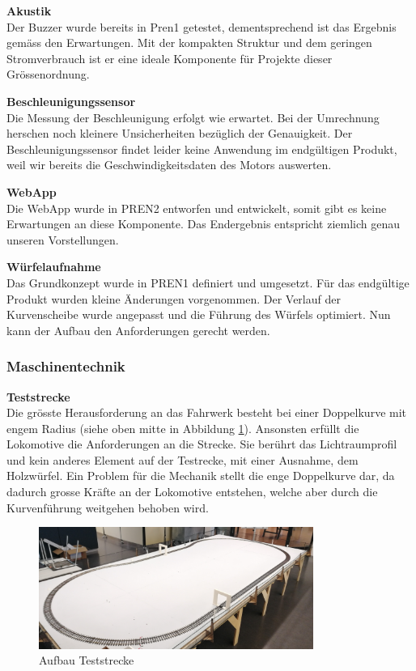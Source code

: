 \documentclass[../../main.tex]{subfiles}
\begin{document}
\textbf{Akustik}\\
Der Buzzer wurde bereits in Pren1 getestet, dementsprechend ist das Ergebnis gemäss den Erwartungen. Mit der kompakten Struktur und dem geringen Stromverbrauch ist er eine ideale Komponente für Projekte dieser Grössenordnung.

\textbf{Beschleunigungssensor}\\
Die Messung der Beschleunigung erfolgt wie erwartet. Bei der Umrechnung herschen noch kleinere Unsicherheiten bezüglich der Genauigkeit. Der Beschleunigungssensor findet leider keine Anwendung im endgültigen Produkt, weil wir bereits die Geschwindigkeitsdaten des Motors auswerten.

\textbf{WebApp}\\
Die WebApp wurde in PREN2 entworfen und entwickelt, somit gibt es keine Erwartungen an diese Komponente. Das Endergebnis entspricht ziemlich genau unseren Vorstellungen.

\textbf{Würfelaufnahme}\\
Das Grundkonzept wurde in PREN1 definiert und umgesetzt. Für das endgültige Produkt wurden kleine Änderungen vorgenommen. Der Verlauf der Kurvenscheibe wurde angepasst und die Führung des Würfels optimiert. Nun kann der Aufbau den Anforderungen gerecht werden. 

\pagebreak

\subsubsection{Maschinentechnik}

\textbf{Teststrecke}\\
Die grösste Herausforderung an das Fahrwerk besteht bei einer Doppelkurve mit engem Radius (siehe oben mitte in Abbildung \ref{fig:teststrecke1}). Ansonsten erfüllt die Lokomotive die Anforderungen an die Strecke. Sie berührt das Lichtraumprofil und kein anderes Element auf der Testrecke, mit einer Ausnahme, dem Holzwürfel. Ein Problem für die Mechanik stellt die enge Doppelkurve dar, da dadurch grosse Kräfte an der Lokomotive entstehen, welche aber durch die Kurvenführung weitgehen behoben wird.\\

\begin{figure}[H]
    \centering
    \includegraphics[width=0.8\textwidth]{teststrecke1.PNG}
    \caption {Aufbau Teststrecke}
    \label{fig:teststrecke1}
  \end{figure}
\end{document}
